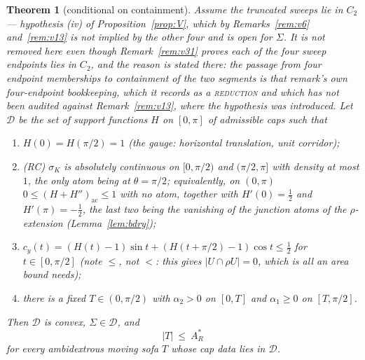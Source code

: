 \documentclass[11pt]{article}
\newtheorem{theorem}{Theorem}
\theoremstyle{definition}
\newcommand{\Sig}{\Sigma}
\begin{document}
\begin{theorem}[conditional on containment]\label{thm:final}
Assume the truncated sweeps lie in $C_2$ --- hypothesis (iv) of Proposition~\ref{prop:V},
which by Remarks~\ref{rem:v6} and~\ref{rem:v13} is not implied by the other four and is open
for $\Sig$. It is not removed here even though Remark~\ref{rem:v31} proves each of the four
sweep endpoints lies in $C_2$, and the reason is stated there: the passage from four endpoint
memberships to containment of the two segments is that remark's own four-endpoint
bookkeeping, which it records as a \textsc{reduction} and which has not been audited against
Remark~\ref{rem:v13}, where the hypothesis was introduced. Let $\mathcal D$ be the set of
support functions $H$ on $[0,\pi]$ of admissible caps such
that
\begin{enumerate}
\item[(a)] $H(0)=H(\pi/2)=1$ \emph{(the gauge: horizontal translation, unit corridor)};
\item[(b)] \emph{(RC)} $\sigma_K$ is absolutely continuous on $[0,\pi/2)$ and $(\pi/2,\pi]$
with density at most $1$, the only atom being at $\theta=\pi/2$; equivalently, on $(0,\pi)$
$0\le(H+H'')_{\mathrm{ac}}\le1$ with no atom, together with $H'(0)=\tfrac12$ and
$H'(\pi)=-\tfrac12$, the last two being the vanishing of the junction atoms of the
$\rho$-extension (Lemma~\ref{lem:bdry});
\item[(c)] $c_y(t)=(H(t)-1)\sin t+(H(t+\pi/2)-1)\cos t\le\tfrac12$ for $t\in[0,\pi/2]$
\emph{(note $\le$, not $<$: this gives $|U\cap\rho U|=0$, which is all an area bound needs)};
\item[(d)] there is a fixed $T\in(0,\pi/2)$ with $\alpha_2>0$ on $[0,T]$ and $\alpha_1\ge0$
on $[T,\pi/2]$.
\end{enumerate}
Then $\mathcal D$ is convex, $\Sig\in\mathcal D$, and
\[
  |T|\ \le\ A_R^\ast
\]
for every ambidextrous moving sofa $T$ whose cap data lies in $\mathcal D$.
\end{theorem}
\end{document}
